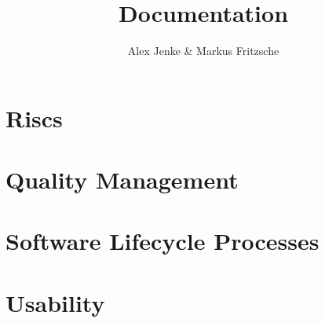 \documentclass{scrreprt}
\author{Alex Jenke \& Markus Fritzsche}
\title{Documentation}
\begin{document}
\maketitle

\section{Riscs}

\section{Quality Management}

\section{Software Lifecycle Processes}

\section{Usability}

\end{document}
